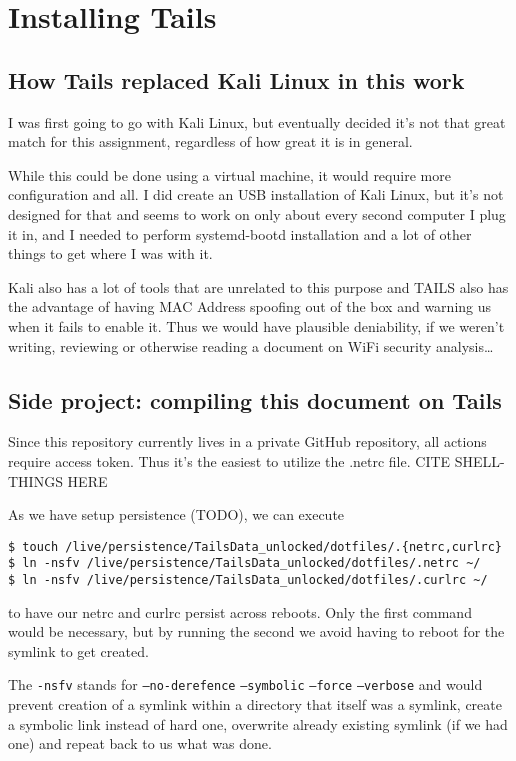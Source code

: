\documentclass[../wifi-security.tex]{subfiles}
\begin{document}
\section{Installing Tails}

\subsection{How Tails replaced Kali Linux in this work}

I was first going to go with Kali Linux, but eventually decided it's not that great match for this assignment, regardless of how great it is in general.

While this could be done using a virtual machine, it would require more configuration and all. I did create an USB installation of Kali Linux, but it's not designed for that and seems to work on only about every second computer I plug it in, and I needed to perform systemd-bootd installation and a lot of other things to get where I was with it.

Kali also has a lot of tools that are unrelated to this purpose and TAILS also has the advantage of having MAC Address spoofing out of the box and warning us when it fails to enable it. Thus we would have plausible deniability, if we weren't writing, reviewing or otherwise reading a document on WiFi security analysis…

\subsection{Side project: compiling this document on Tails}

Since this repository currently lives in a private GitHub repository, all actions require access token. Thus it's the easiest to utilize the .netrc file. CITE SHELL-THINGS HERE

As we have setup persistence (TODO), we can execute

\begin{verbatim}
$ touch /live/persistence/TailsData_unlocked/dotfiles/.{netrc,curlrc}
$ ln -nsfv /live/persistence/TailsData_unlocked/dotfiles/.netrc ~/
$ ln -nsfv /live/persistence/TailsData_unlocked/dotfiles/.curlrc ~/
\end{verbatim}

to have our netrc and curlrc persist across reboots. Only the first command would be necessary, but by running the second we avoid having to reboot for the symlink to get created.

The \texttt{-nsfv} stands for \texttt{--no-derefence} \texttt{--symbolic} \texttt{--force} \texttt{--verbose} and would prevent creation of a symlink within a directory that itself was a symlink, create a symbolic link instead of hard one, overwrite already existing symlink (if we had one) and repeat back to us what was done.
\end{document}
